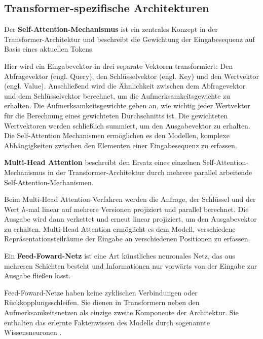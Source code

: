 \subsection{Transformer-spezifische Architekturen}

\begin{definition}\label{def:self-attention-mechanismus}
    Der \textbf{Self-Attention-Mechanismus} ist ein zentrales Konzept in der Transformer-Architektur und beschreibt die Gewichtung der Eingabesequenz auf Basis eines aktuellen Tokens.
\end{definition}
Hier wird ein Eingabevektor in drei separate Vektoren transformiert:
Den Abfragevektor (engl. Query), den Schlüsselvektor (engl. Key) und den Wertvektor (engl. Value).
Anschließend wird die Ähnlichkeit zwischen dem Abfragevektor und dem Schlüsselvektor berechnet,
um die Aufmerksamkeitsgewichte zu erhalten.
Die Aufmerksamkeitsgewichte geben an, wie wichtig jeder Wertvektor für die Berechnung eines gewichteten
Durchschnitts ist. Die gewichteten Wertvektoren werden schließlich summiert, um den Ausgabevektor zu erhalten.
Die Self-Attention Mechanismen ermöglichen es den Modellen, komplexe Abhängigkeiten zwischen den Elementen einer Eingabesequenz zu erfassen.\\

\begin{definition}\label{def:multi-head-attention}
    \textbf{Multi-Head Attention} beschreibt den Ersatz eines einzelnen Self-Attention-Mechanismus in der Transformer-Architektur durch mehrere parallel arbeitende Self-Attention-Mechanismen.
\end{definition}
Beim Multi-Head Attention-Verfahren werden die Anfrage, der Schlüssel und der Wert $h$-mal linear auf mehrere Versionen projiziert und parallel berechnet. Die Ausgabe wird dann verkettet und erneut linear projiziert, um den Ausgabevektor zu erhalten. Multi-Head Attention ermöglicht es dem Modell, verschiedene Repräsentationsteilräume der Eingabe an verschiedenen Positionen zu erfassen.

\begin{definition}\label{def:feed-forward-netz}
    Ein \textbf{Feed-Foward-Netz} ist eine Art künstliches neuronales Netz, das aus mehreren Schichten besteht und Informationen nur vorwärts von der Eingabe zur Ausgabe fließen lässt.
\end{definition}
Feed-Foward-Netze haben keine zyklischen Verbindungen oder Rückkopplungsschleifen.
Sie dienen in Transformern neben den Aufmerksamkeitsnetzen als einzige zweite Komponente der Architektur.
Sie enthalten das erlernte Faktenwissen des Modells durch sogenannte Wissensneuronen \citep{knowledge_neurons}.\\

